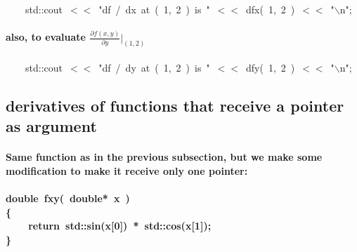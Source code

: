 \documentclass[9pt,onside,a4paper]{article}
\newcommand{\hlstd}[1]{\textcolor[rgb]{0.2,0,0.4}{#1}}
\newcommand{\hlnum}[1]{\textcolor[rgb]{0.2,0.73,0.02}{#1}}
\newcommand{\hlesc}[1]{\textcolor[rgb]{0.65,0.09,0.38}{#1}}
\newcommand{\hlstr}[1]{\textcolor[rgb]{0.09,0.38,0.65}{#1}}
\newcommand{\hlopt}[1]{\textcolor[rgb]{0.33,0.33,0.33}{#1}}
\newcommand{\hlkwa}[1]{\textcolor[rgb]{1,0.19,0.19}{#1}}
\newcommand{\hlkwb}[1]{\textcolor[rgb]{0.96,0.55,0.14}{#1}}
\newcommand{\hlkwd}[1]{\textcolor[rgb]{0.82,0.11,0.93}{#1}}
\begin{document}
\hlstd{\ \ \ \ }\hlstd{std}\hlopt{::}\hlstd{cout\ }\hlopt{$<$$<$\ }\hlstd{}\hlstr{"df\ /\ dx\ at\ (\ 1,\ 2\ )\ is\ "}\hlstd{\ }\hlopt{$<$$<$\ }\hlstd{}\hlkwd{dfx}\hlstd{}\hlopt{(\ }\hlstd{}\hlnum{1}\hlstd{}\hlopt{,\ }\hlstd{}\hlnum{2\ }\hlstd{}\hlopt{)\ $<$$<$\ }\hlstd{}\hlstr{"}\hlesc{$\backslash$n}\hlstr{"}\hlstd{}\hlopt{;}\hspace*{\fill}\\

\paragraph{also, to evaluate $\frac{\partial{f(x,y)}}{\partial{y}} \Big|_{(1,2)}$\\}

\hlstd{}\hlstd{\ \ \ \ }\hlstd{std}\hlopt{::}\hlstd{cout\ }\hlopt{$<$$<$\ }\hlstd{}\hlstr{"df\ /\ dy\ at\ (\ 1,\ 2\ )\ is\ "}\hlstd{\ }\hlopt{$<$$<$\ }\hlstd{}\hlkwd{dfy}\hlstd{}\hlopt{(\ }\hlstd{}\hlnum{1}\hlstd{}\hlopt{,\ }\hlstd{}\hlnum{2\ }\hlstd{}\hlopt{)\ $<$$<$\ }\hlstd{}\hlstr{"}\hlesc{$\backslash$n}\hlstr{"}\hlstd{}\hlopt{;}\hspace*{\fill}\\

\subsection{derivatives of functions that receive a pointer as argument}

\paragraph{Same function as in the previous subsection, but we make some modification to make it receive only one pointer:\\}
\paragraph{
\hlkwb{double\ }\hlstd{}\hlkwd{fxy}\hlstd{}\hlopt{(\ }\hlstd{}\hlkwb{double}\hlstd{}\hlopt{{*}\ }\hlstd{x\ }\hlopt{)}\hspace*{\fill}\\
\hlstd{}\hlopt{\{}\hspace*{\fill}\\
\hlstd{}\hlstd{\ \ \ \ }\hlstd{}\hlkwa{return\ }\hlstd{std}\hlopt{::}\hlstd{}\hlkwd{sin}\hlstd{}\hlopt{(}\hlstd{x}\hlopt{{[}}\hlstd{}\hlnum{0}\hlstd{}\hlopt{{]})\ {*}\ }\hlstd{std}\hlopt{::}\hlstd{}\hlkwd{cos}\hlstd{}\hlopt{(}\hlstd{x}\hlopt{{[}}\hlstd{}\hlnum{1}\hlstd{}\hlopt{{]});}\hspace*{\fill}\\
\hlstd{}\hlopt{\}}\hspace*{\fill}\\ }
\end{document}
